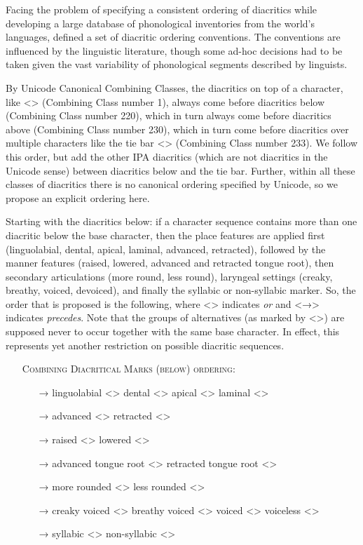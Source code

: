 Facing the problem of specifying a consistent ordering of diacritics while
developing a large database of phonological inventories from the world's
languages, \citet[540]{Moran2012} defined a set of diacritic ordering
conventions. The conventions are influenced by the linguistic literature, though
some ad-hoc decisions had to be taken given the vast variability of phonological
segments described by linguists. 

By Unicode Canonical Combining Classes, the diacritics on top of a character,
like <> (Combining Class number 1), always come before diacritics
below (Combining Class number 220), which in turn always come before diacritics
above (Combining Class number 230), which in turn come before diacritics over
multiple characters like the tie bar <>
(Combining Class number 233). We follow this order, but add the other IPA
diacritics (which are not diacritics in the Unicode sense) between diacritics
below and the tie bar. Further, within all these classes of diacritics there is
no canonical ordering specified by Unicode, so we propose an explicit ordering
here.

Starting with the diacritics below: if a character sequence contains more than
one diacritic below the base character, then the place features are applied
first (linguolabial, dental, apical, laminal, advanced, retracted), followed by
the manner features (raised, lowered, advanced and retracted tongue root), then
secondary articulations (more round, less round), laryngeal settings (creaky,
breathy, voiced, devoiced), and finally the syllabic or non-syllabic marker. So,
the order that is proposed is the following, where <\textbar{}> indicates
\textit{or} and <→> indicates \textit{precedes}. Note that the groups of
alternatives (as marked by <\textbar{}>) are supposed never to occur together
with the same base character. In effect, this represents yet another restriction
on possible diacritic sequences.

\begin{itemize}
	\item[] \textsc{Combining Diacritical Marks (below) ordering:}
	\begin{itemize}	
	  \item[→] linguolabial <> \textbar{} dental <> \textbar{} apical <> \textbar{} laminal <>
	  \item[→] advanced <> \textbar{} retracted <> 
	  \item[→] raised <> \textbar{} lowered <>
	  \item[→] advanced tongue root <> \textbar{} retracted tongue root <>
	  \item[→] more rounded <> \textbar{} less rounded <>
	  \item[→] creaky voiced <> \textbar{} breathy voiced <> \textbar{} voiced <> \textbar{} voiceless <>
	  \item[→] syllabic <> \textbar{} non-syllabic <>
	\end{itemize}
 \end{itemize}

